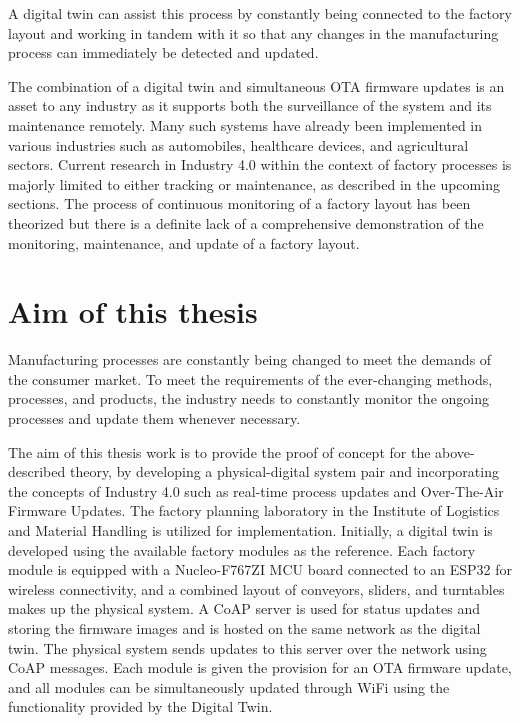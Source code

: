 A digital twin can assist this process by constantly being connected to the factory layout and working in tandem with it so that any changes in the manufacturing process can immediately be detected and updated.

The combination of a digital twin and simultaneous \acrshort{OTA} firmware updates is an asset to any industry as it supports both the surveillance of the system and its maintenance remotely. Many such systems have already been implemented in various industries such as automobiles, healthcare devices, and agricultural sectors. Current research in Industry 4.0 within the context of factory processes is majorly limited to either tracking or maintenance, as described in the upcoming sections. The process of continuous monitoring of a factory layout has been theorized but there is a definite lack of a comprehensive demonstration of the monitoring, maintenance, and update of a factory layout.

	\section{Aim of this thesis}
 Manufacturing processes are constantly being changed to meet the demands of the consumer market. To meet the requirements of the ever-changing methods, processes, and products, the industry needs to constantly monitor the ongoing processes and update them whenever necessary. 
	
 The aim of this thesis work is to provide the proof of concept for the above-described theory, by developing a physical-digital system pair and incorporating the concepts of Industry 4.0 such as real-time process updates and Over-The-Air Firmware Updates. The factory planning laboratory in the Institute of Logistics and Material Handling is utilized for implementation. Initially, a digital twin is developed using the available factory modules as the reference. Each factory module is equipped with a Nucleo-F767ZI \acrshort{MCU} board connected to an ESP32 for wireless connectivity, and a combined layout of conveyors, sliders, and turntables makes up the physical system. A CoAP server is used for status updates and storing the firmware images and is hosted on the same network as the digital twin. The physical system sends updates to this server over the network using CoAP messages. Each module is given the provision for an \acrshort{OTA} firmware update, and all modules can be simultaneously updated through WiFi using the functionality provided by the Digital Twin.

